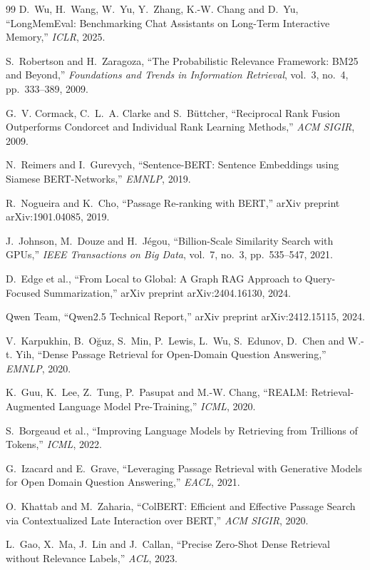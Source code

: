 \begin{thebibliography}{99}
 D.~Wu, H.~Wang, W.~Yu, Y.~Zhang, K.-W. Chang and D.~Yu, ``LongMemEval: Benchmarking
Chat Assistants on Long-Term Interactive Memory,'' \emph{ICLR}, 2025.

 S.~Robertson and H.~Zaragoza, ``The Probabilistic Relevance Framework: BM25 and Beyond,''
\emph{Foundations and Trends in Information Retrieval}, vol.~3, no.~4, pp.~333--389, 2009.

 G.~V. Cormack, C.~L.~A. Clarke and S.~B\"{u}ttcher, ``Reciprocal Rank Fusion Outperforms Condorcet
and Individual Rank Learning Methods,'' \emph{ACM SIGIR}, 2009.

 N.~Reimers and I.~Gurevych, ``Sentence-BERT: Sentence Embeddings using Siamese
BERT-Networks,'' \emph{EMNLP}, 2019.

 R.~Nogueira and K.~Cho, ``Passage Re-ranking with BERT,'' arXiv preprint
arXiv:1901.04085, 2019.

 J.~Johnson, M.~Douze and H.~J\'{e}gou, ``Billion-Scale Similarity Search with GPUs,''
\emph{IEEE Transactions on Big Data}, vol.~7, no.~3, pp.~535--547, 2021.

 D.~Edge et al., ``From Local to Global: A Graph RAG Approach to Query-Focused
Summarization,'' arXiv preprint arXiv:2404.16130, 2024.

 Qwen Team, ``Qwen2.5 Technical Report,'' arXiv preprint arXiv:2412.15115, 2024.

 V.~Karpukhin, B.~O\u{g}uz, S.~Min, P.~Lewis, L.~Wu, S.~Edunov, D.~Chen and W.-t. Yih, ``Dense
Passage Retrieval for Open-Domain Question Answering,'' \emph{EMNLP}, 2020.

 K.~Guu, K.~Lee, Z.~Tung, P.~Pasupat and M.-W. Chang, ``REALM: Retrieval-Augmented Language
Model Pre-Training,'' \emph{ICML}, 2020.

 S.~Borgeaud et al., ``Improving Language Models by Retrieving from Trillions of Tokens,''
\emph{ICML}, 2022.

 G.~Izacard and E.~Grave, ``Leveraging Passage Retrieval with Generative Models for Open Domain
Question Answering,'' \emph{EACL}, 2021.

 O.~Khattab and M.~Zaharia, ``ColBERT: Efficient and Effective Passage Search via
Contextualized Late Interaction over BERT,'' \emph{ACM SIGIR}, 2020.

 L.~Gao, X.~Ma, J.~Lin and J.~Callan, ``Precise Zero-Shot Dense Retrieval without Relevance
Labels,'' \emph{ACL}, 2023.


\end{thebibliography}
